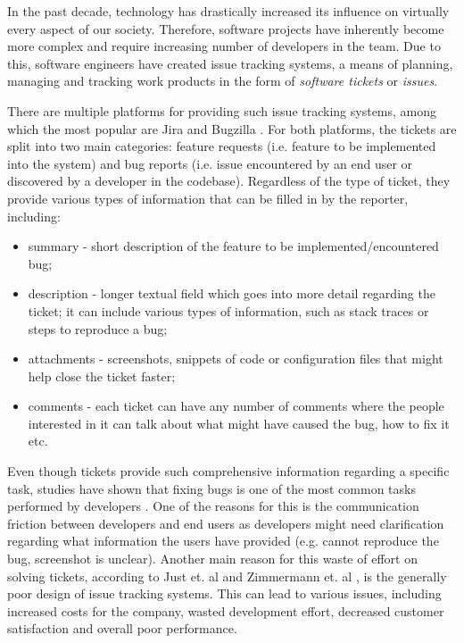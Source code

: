 \documentclass{mpaper}
\begin{document}
In the past decade, technology has drastically increased its influence on 
virtually every aspect of our society. Therefore, software projects have 
inherently become more complex and require increasing number of developers in
the team. Due to this, software engineers have created issue tracking systems,
a means of planning, managing and tracking work products in the form of 
\emph{software tickets} or \emph{issues}.

There are multiple platforms for providing such issue tracking systems, among which
the most popular are Jira \cite{jira} and Bugzilla \cite{bugzilla}. For both platforms,
the tickets are split into two main categories: feature requests (i.e. feature to be 
implemented into the system) and bug reports (i.e. issue encountered by an end user or
discovered by a developer in the codebase). Regardless of the type of ticket, they provide
various types of information that can be filled in by the reporter, including:
  \begin{itemize}
    \item summary - short description of the feature to be implemented/encountered bug;
    \item description - longer textual field which goes into more detail regarding the ticket;
    it can include various types of information, such as stack traces or steps to reproduce a bug;
    \item attachments - screenshots, snippets of code or configuration files that might help
    close the ticket faster;
    \item comments - each ticket can have any number of comments where the people interested in 
    it can talk about what might have caused the bug, how to fix it etc.
  \end{itemize}

Even though tickets provide such comprehensive information regarding a specific task, studies have shown 
that fixing bugs is one of the most common tasks performed by developers \cite{latoza2006maintaining}. One of
the reasons for this is the communication friction between developers and end users \cite{Korkala2014WasteIdentification}
as developers might need clarification regarding what information the users have provided (e.g. cannot reproduce the bug, 
screenshot is unclear). Another main reason for this waste of effort on solving tickets, according to 
Just et. al \cite{just2008towards} and Zimmermann et. al \cite{zimmermann2009improving}, is the generally poor design of issue 
tracking systems. This can lead to various issues, including increased costs for the company, wasted development effort, 
decreased customer satisfaction and overall poor performance.
\end{document}
